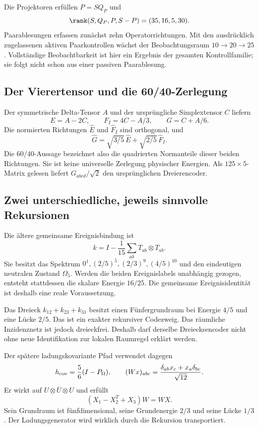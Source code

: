 Die Projektoren erfüllen $P=SQ_P$ und
\begin{equation}
\rank(S,Q_P,P,S-P)=(35,16,5,30).
\end{equation}
Paarablesungen erfassen zunächst zehn Operatorrichtungen. Mit den ausdrücklich zugelassenen aktiven Paarkontrollen wächst der Beobachtungsraum $10\to20\to25$. Vollständige Beobachtbarkeit ist hier ein Ergebnis der gesamten Kontrollfamilie; sie folgt nicht schon aus einer passiven Paarablesung.

\subsection{Der Vierertensor und die 60/40-Zerlegung}
Der symmetrische Delta-Tensor $A$ und der ursprüngliche Simplextensor $C$ liefern
\begin{equation}
E=A-2C,\qquad F_I=4C-A/3,\qquad G=C+A/6.
\end{equation}
Die normierten Richtungen $\widehat E$ und $\widehat F_I$ sind orthogonal, und
\begin{equation}
\widehat G=\sqrt{3/5}\,\widehat E+\sqrt{2/5}\,\widehat F_I.
\end{equation}
Die 60/40-Aussage bezeichnet also die quadrierten Normanteile dieser beiden Richtungen. Sie ist keine universelle Zerlegung physischer Energien. Als $125\times5$-Matrix gelesen liefert $G_{abcd}/\sqrt2$ den ursprünglichen Dreierencoder.

\subsection{Zwei unterschiedliche, jeweils sinnvolle Rekursionen}
Die ältere gemeinsame Ereignisbindung ist
\begin{equation}
k=I-\frac1{15}\sum_{ab}T_{ab}\otimes T_{ab}.
\end{equation}
Sie besitzt das Spektrum $0^1,(2/5)^5,(2/3)^9,(4/5)^{10}$ und den eindeutigen neutralen Zustand $\Omega_5$. Werden die beiden Ereignislabels unabhängig gezogen, entsteht stattdessen die skalare Energie $16/25$. Die gemeinsame Ereignisidentität ist deshalb eine reale Voraussetzung.

Das Dreieck $k_{12}+k_{23}+k_{31}$ besitzt einen Fünfergrundraum bei Energie $4/5$ und eine Lücke $2/5$. Das ist ein exakter rekursiver Codezweig. Das räumliche Inzidenznetz ist jedoch dreieckfrei. Deshalb darf derselbe Dreiecksencoder nicht ohne neue Identifikation zur lokalen Raumregel erklärt werden.

Der spätere ladungskovariante Pfad verwendet dagegen
\begin{equation}
h_{\rm cov}=\frac56(I-P_\Omega),\qquad
(Wx)_{abc}=\frac{\delta_{ab}x_c+x_a\delta_{bc}}{\sqrt{12}}.
\end{equation}
Er wirkt auf $U\otimes\overline U\otimes U$ und erfüllt
\begin{equation}
(X_1-X_2^T+X_3)W=WX.
\end{equation}
Sein Grundraum ist fünfdimensional, seine Grundenergie $2/3$ und seine Lücke $1/3$. Der Ladungsgenerator wird wirklich durch die Rekursion transportiert.

